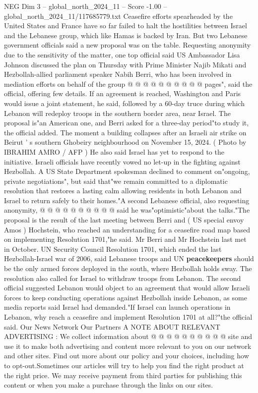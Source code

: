 \begin{textsample}{NEG Dim 3 – global\_north\_2024\_11 – Score -1.00 – global\_north\_2024\_11/117685779.txt}
Ceasefire efforts spearheaded by the United States and France have so far failed to halt the hostilities between Israel and the Lebanese group, which like Hamas is backed by Iran.
But two Lebanese government officials said a new proposal was on the table.
Requesting anonymity due to the sensitivity of the matter, one top official said US Ambassador Lisa Johnson discussed the plan on Thursday with Prime Minister Najib Mikati and Hezbollah-allied parliament speaker Nabih Berri, who has been involved in mediation efforts on behalf of the group @ @ @ @ @ @ @ @ @ @ pages", said the official, offering few details.
If an agreement is reached, Washington and Paris would issue a joint statement, he said, followed by a 60-day truce during which Lebanon will redeploy troops in the southern border area, near Israel.
The proposal is"an American one, and Berri asked for a three-day period"to study it, the official added.
The moment a building collapses after an Israeli air strike on Beirut ' s southern Ghobeiry neighbourhood on November 15, 2024. ( Photo by IBRAHIM AMRO / AFP ) He also said Israel has yet to respond to the initiative.
Israeli officials have recently vowed no let-up in the fighting against Hezbollah.
A US State Department spokesman declined to comment on"ongoing, private negotiations", but said that"we remain committed to a diplomatic resolution that restores a lasting calm allowing residents in both Lebanon and Israel to return safely to their homes."A second Lebanese official, also requesting anonymity, @ @ @ @ @ @ @ @ @ @ said he was"optimistic"about the talks."The proposal is the result of the last meeting between Berri and ( US special envoy Amos ) Hochstein, who reached an understanding for a ceasefire road map based on implementing Resolution 1701,"he said.
Mr Berri and Mr Hochstein last met in October.
UN Security Council Resolution 1701, which ended the last Hezbollah-Israel war of 2006, said Lebanese troops and UN \textbf{peacekeepers} should be the only armed forces deployed in the south, where Hezbollah holds sway.
The resolution also called for Israel to withdraw troops from Lebanon.
The second official suggested Lebanon would object to an agreement that would allow Israeli forces to keep conducting operations against Hezbollah inside Lebanon, as some media reports said Israel had demanded."If Israel can launch operations in Lebanon, why reach a ceasefire and implement Resolution 1701 at all?"the official said.
Our News Network Our Partners A NOTE ABOUT RELEVANT ADVERTISING : We collect information about @ @ @ @ @ @ @ @ @ @ site and use it to make both advertising and content more relevant to you on our network and other sites.
Find out more about our policy and your choices, including how to opt-out.Sometimes our articles will try to help you find the right product at the right price.
We may receive payment from third parties for publishing this content or when you make a purchase through the links on our sites.

\end{textsample}

